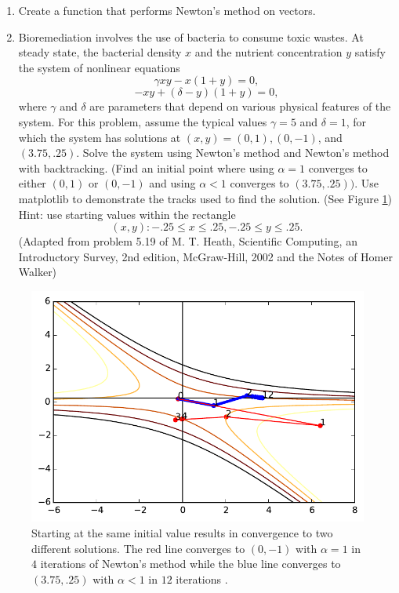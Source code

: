 \begin{problem}
\begin{enumerate}

\item Create a  function that performs Newton's method on vectors.
\item Bioremediation involves the use of bacteria to consume toxic wastes.
At steady state, the bacterial density $x$ and the nutrient concentration $y$ satisfy the system of nonlinear equations
\[
\gamma xy - x(1 + y) = 0,
\]
\[
 -xy + (\delta - y)(1 + y) = 0,
\]
where $\gamma$ and $\delta$ are parameters that depend on various physical features of the system. 
For this problem, assume the typical values $\gamma = 5$ and $\delta = 1$, for which the system has solutions at $(x, y) = (0, 1), (0, -1)$, and $(3.75, .25)$. 
Solve the system using Newton's method and Newton's method with backtracking. 
(Find an initial point where using $\alpha = 1$ converges to either $(0, 1)$ or $(0, -1)$ and using $\alpha < 1$ converges to $(3.75, .25)).$  
Use  matplotlib to demonstrate the tracks used to find the solution. (See Figure \ref{fig:contour_plot})
Hint: use starting values within the rectangle 
\[
{(x, y) : -.25 \leqslant x \leqslant .25, -.25 \leqslant y \leqslant .25}.
\]
(Adapted from problem 5.19 of M. T. Heath, Scientific Computing, an Introductory Survey, 2nd edition, McGraw-Hill, 2002 and the Notes of Homer Walker)
\end{enumerate}
\end{problem}

\begin{figure}[h]
\label{fig:contour_plot}
\centering
\includegraphics[width=\textwidth]{contour}
\caption{Starting at the same initial value results in convergence to two different solutions.  The red line converges to $(0,-1)$ with $\alpha = 1$ in $4$ iterations of Newton's method while the blue line converges to $(3.75,.25)$ with $\alpha < 1$ in $12$ iterations .}
\end{figure}

